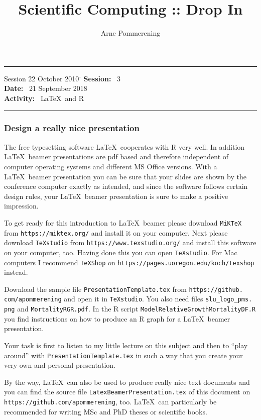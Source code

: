 \documentclass[12pt]{article}
\title{\textbf{Scientific Computing :: Drop In}}
\author{Arne Pommerening}
\date{\empty} %
\begin{document}
\maketitle

\thispagestyle{empty} 
\noindent
\rule{\textwidth}{0.2mm}
\begin{tabbing}
Session \quad \=  22 October 2010 \quad \= \kill
\textbf{Session:} \>\  3 \\
\textbf{Date:} \>\ 21 September 2018\\
\textbf{Activity:} \>\ \LaTeX\ and R
\end{tabbing}
\rule{\textwidth}{0.2mm}

\subsubsection*{Design a really nice presentation}
The free typesetting software \LaTeX\ cooperates with R very well. In addition \LaTeX\ beamer presentations are pdf based and therefore independent of computer operating systems and different MS Office versions. With a \LaTeX\ beamer presentation you can be sure that your slides are shown by the conference computer exactly as intended, and since the software follows certain design rules, your \LaTeX\ beamer presentation is sure to make a positive impression. 

To get ready for this introduction to \LaTeX\ beamer please download \texttt{MiKTeX} from \texttt{https://miktex.org/} and install it on your computer. Next please download \texttt{TeXstudio} from \texttt{https://www.texstudio.org/} and install this software on your computer, too. Having done this you can open \texttt{TeXstudio}. For Mac computers I recommend \texttt{TeXShop} on \texttt{https://pages.uoregon.edu/koch/texshop} instead.  

Download the sample file \verb+PresentationTemplate.tex+ from \verb+https://github.+ \verb+com/apommerening+ and open it in \texttt{TeXstudio}. You also need files \verb+slu_logo_pms.+ \verb+png+ and \verb+MortalityRGR.pdf+. In the R script \verb+ModelRelativeGrowthMortalityDF.R+ you find instructions on how to produce an R graph for a \LaTeX\ beamer presentation. 

Your task is first to listen to my little lecture on this subject and then to ``play around'' with \verb+PresentationTemplate.tex+ in such a way that you create your very own and personal presentation.

By the way, \LaTeX\ can also be used to produce really nice text documents and you can find the source file \verb+LatexBeamerPresentation.tex+ of this document on \verb+https://github.com/apommerening+, too. \LaTeX\ can particularly be recommended for writing MSc and PhD theses or scientific books.  
\end{document}

